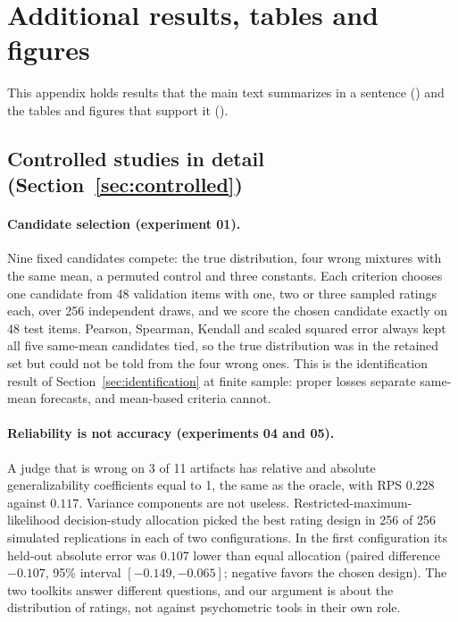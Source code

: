 \section{Additional results, tables and figures}
\label{app:extra}

This appendix holds results that the main text summarizes in a sentence () and the tables and figures that support it ().

\subsection{Controlled studies in detail (Section~\ref{sec:controlled})}
\label{app:extra-controlled}

\paragraph{Candidate selection (experiment 01).}
Nine fixed candidates compete: the true distribution, four wrong mixtures with the same mean, a permuted control and three constants.
Each criterion chooses one candidate from 48 validation items with one, two or three sampled ratings each, over 256 independent draws, and we score the chosen candidate exactly on 48 test items.
Pearson, Spearman, Kendall and scaled squared error always kept all five same-mean candidates tied, so the true distribution was in the retained set but could not be told from the four wrong ones.
This is the identification result of Section~\ref{sec:identification} at finite sample: proper losses separate same-mean forecasts, and mean-based criteria cannot.

\paragraph{Reliability is not accuracy (experiments 04 and 05).}
A judge that is wrong on 3 of 11 artifacts has relative and absolute generalizability coefficients equal to 1, the same as the oracle, with RPS $0.228$ against $0.117$.
Variance components are not useless. Restricted-maximum-likelihood decision-study allocation picked the best rating design in 256 of 256 simulated replications in each of two configurations. In the first configuration its held-out absolute error was $0.107$ lower than equal allocation (paired difference $-0.107$, 95\% interval $[-0.149,-0.065]$; negative favors the chosen design).
The two toolkits answer different questions, and our argument is about the distribution of ratings, not against psychometric tools in their own role.

